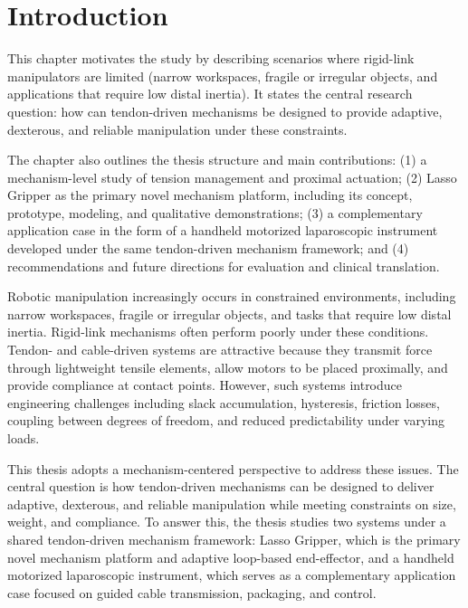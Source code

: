 ﻿%
\chapter{Introduction} %
\label{Chapter1} %


\begin{chaptersummary}
This chapter motivates the study by describing scenarios where rigid-link manipulators are limited (narrow workspaces, fragile or irregular objects, and applications that require low distal inertia). It states the central research question: how can tendon-driven mechanisms be designed to provide adaptive, dexterous, and reliable manipulation under these constraints.

The chapter also outlines the thesis structure and main contributions: (1) a mechanism-level study of tension management and proximal actuation; (2) Lasso Gripper as the primary novel mechanism platform, including its concept, prototype, modeling, and qualitative demonstrations; (3) a complementary application case in the form of a handheld motorized laparoscopic instrument developed under the same tendon-driven mechanism framework; and (4) recommendations and future directions for evaluation and clinical translation.
\end{chaptersummary}

\begin{sloppypar}
Robotic manipulation increasingly occurs in constrained environments, including narrow workspaces, fragile or irregular objects, and tasks that require low distal inertia. Rigid-link mechanisms often perform poorly under these conditions. Tendon- and cable-driven systems are attractive because they transmit force through lightweight tensile elements, allow motors to be placed proximally, and provide compliance at contact points. However, such systems introduce engineering challenges including slack accumulation, hysteresis, friction losses, coupling between degrees of freedom, and reduced predictability under varying loads.
\end{sloppypar}

This thesis adopts a mechanism-centered perspective to address these issues. The central question is how tendon-driven mechanisms can be designed to deliver adaptive, dexterous, and reliable manipulation while meeting constraints on size, weight, and compliance. To answer this, the thesis studies two systems under a shared tendon-driven mechanism framework: Lasso Gripper, which is the primary novel mechanism platform and adaptive loop-based end-effector, and a handheld motorized laparoscopic instrument, which serves as a complementary application case focused on guided cable transmission, packaging, and control.

